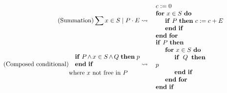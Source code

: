 \documentclass[runningheads]{llncs}
\begin{document}
\begin{align}
    \tag{Summation}
    \sum x \in S \mid P \cdot E
    &\leadsto
    \begin{minipage}[]{0.4\textwidth}
    \begin{algorithmic}
    \State $c := 0$
    \For{$x \in S$}
        \If{$P$} %
            $c := c + E$
        \EndIf
    \EndFor
    \end{algorithmic}
    \end{minipage}
    \\
    \tag{Composed conditional}
    \begin{minipage}[]{0.33\textwidth}
    \begin{algorithmic}
        \If{$P \land x \in S \land Q$}
            $p$
        \EndIf
    \end{algorithmic}
    where $x$ not free in $P$ %
    \end{minipage}
    & \leadsto
    \begin{minipage}[]{0.26\textwidth}
    \begin{algorithmic}
    \If{$P$}
        \For{$x \in S$}
            \If{$Q$}
                $p$
            \EndIf
        \EndFor
    \EndIf
    \end{algorithmic}
    \end{minipage}
\end{align}
\end{document}

